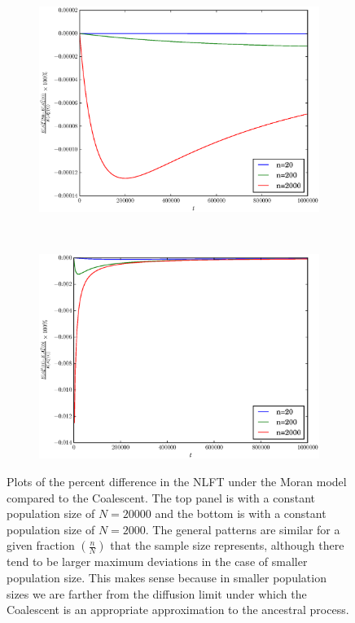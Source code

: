 \documentclass[11pt]{article}
\begin{document}
\begin{center}
	\begin{figure}[!ht]
		\begin{subfigure}[t]{\textwidth}
			\includegraphics[scale=0.7]{../plots/moran_figure3}
		\end{subfigure}
		~
		\begin{subfigure}[t]{\textwidth}
			\includegraphics[scale=0.7]{../plots/moran_figure4}
		\end{subfigure}
		\caption{Plots of the percent difference in the NLFT under the Moran model compared to the Coalescent. The top panel is with a constant population size of $N=20000$ and the bottom is with a constant population size of $N=2000$. The general patterns are similar for a given fraction $(\frac{n}{N})$ that the sample size represents, although there tend to be larger maximum deviations in the case of smaller population size. This makes sense because in smaller population sizes we are farther from the diffusion limit under which the Coalescent is an appropriate approximation to the ancestral process.}
	\end{figure}

\end{center}
\end{document}
